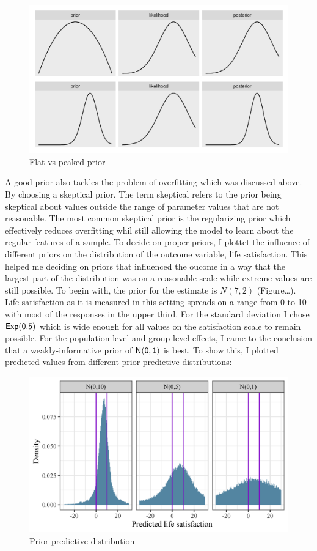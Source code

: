 \documentclass[a4, 12pt]{article}
\begin{document}
\begin{figure}[H]

{\centering \includegraphics[width=0.8\linewidth,]{../figures/flat_peaked} 

}

\caption{Flat vs peaked prior}\label{fig:flat-peaked}
\end{figure}

A good prior also tackles the problem of overfitting which was discussed above. By choosing a skeptical prior. The term skeptical refers to the prior being skeptical about values outside the range of parameter values that are not reasonable. The most common skeptical prior is the regularizing prior which effectively reduces overfitting whil still allowing the model to learn about the regular features of a sample.
To decide on proper priors, I plottet the influence of different priors on the distribution of the outcome variable, life satisfaction. This helped me deciding on priors that influenced the oucome in a way that the largest part of the distribution was on a reasonable scale while extreme values are still possible. To begin with, the prior for the estimate is \(N(7,2)\) (Figure\ldots). Life satisfaction as it is measured in this setting spreads on a range from 0 to 10 with most of the responses in the upper third. For the standard deviation I chose \(\sf {Exp}(0.5)\) which is wide enough for all values on the satisfaction scale to remain possible. For the population-level and group-level effects, I came to the conclusion that a weakly-informative prior of \(\sf {N}(0,1)\) is best. To show this, I plotted predicted values from different prior predictive distributions:

\begin{figure}[H]

{\centering \includegraphics[width=0.8\linewidth,]{../figures/prior_predict} 

}

\caption{Prior predictive distribution}\label{fig:lsat-predicted}
\end{figure}
\end{document}
